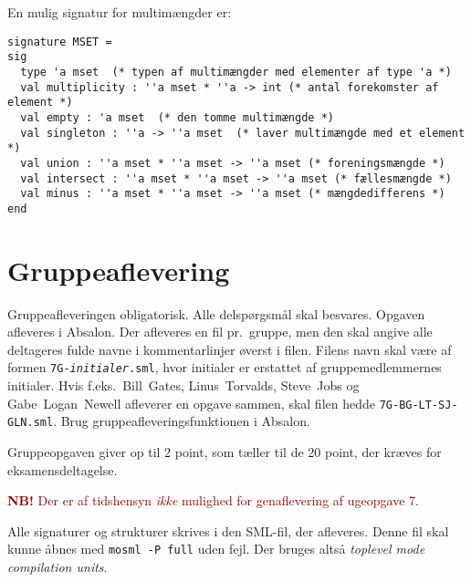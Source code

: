 \documentclass[a4paper,12pt]{article}
\begin{document}
En mulig signatur for multimængder er:
\vspace{1ex}

\begin{Verbatim}
signature MSET =
sig
  type 'a mset  (* typen af multimængder med elementer af type 'a *)
  val multiplicity : ''a mset * ''a -> int (* antal forekomster af element *)
  val empty : 'a mset  (* den tomme multimængde *)
  val singleton : ''a -> ''a mset  (* laver multimængde med et element *)
  val union : ''a mset * ''a mset -> ''a mset (* foreningsmængde *)
  val intersect : ''a mset * ''a mset -> ''a mset (* fællesmængde *)
  val minus : ''a mset * ''a mset -> ''a mset (* mængdedifferens *)
end
\end{Verbatim}

\newpage
\section{Gruppeaflevering}
\label{sec:gruppeaflevering}
Gruppeafleveringen obligatorisk.  Alle delspørgsmål skal besvares.
Opgaven afleveres i Absalon.  Der afleveres en fil pr.\ gruppe, men
den skal angive alle deltageres fulde navne i kommentarlinjer øverst i
filen. Filens navn skal være af formen
\texttt{7G-\textit{initialer}.sml}, hvor initialer er erstattet af
gruppemedlemmernes initialer. Hvis f.eks.\ Bill~Gates, Linus~Torvalds,
Steve~Jobs og Gabe~Logan~Newell afleverer en opgave sammen, skal filen
hedde \texttt{7G-BG-LT-SJ-GLN.sml}. Brug gruppeafleveringsfunktionen i
Absalon.

Gruppeopgaven giver op til 2 point, som tæller til de 20 point, der
kræves for eksamensdeltagelse.

\textcolor{darkred}{\textbf{NB!} Der er af tidshensyn \emph{ikke}
  mulighed for genaflevering af ugeopgave 7.}

\vspace{1ex}

Alle signaturer og strukturer skrives i den SML-fil, der afleveres.
Denne fil skal kunne åbnes med \texttt{mosml -P full} uden fejl.  Der
bruges altså \emph{toplevel mode compilation units}.
\end{document}
